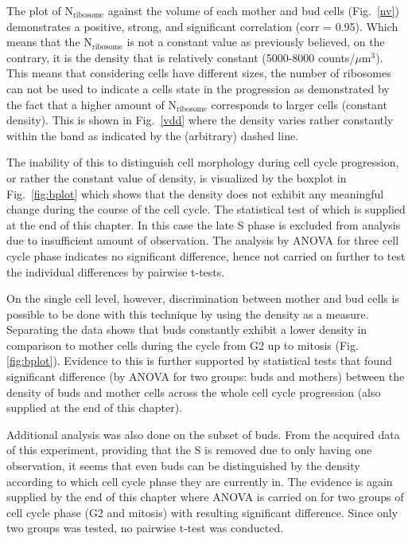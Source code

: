 The plot of N$_{\text{ribosome}}$ against the volume of each mother and bud cells (Fig.~\ref{nv}) demonstrates a positive, strong, and significant correlation (corr = 0.95). 
Which means that the N$_{\text{ribosome}}$ is not a constant value as previously believed, on the contrary, it is the density that is relatively constant (5000-8000 counts/$\mu$m$^3$).
This means that considering cells have different sizes, the number of ribosomes can not be used to indicate a cells state in the progression as demonstrated by the fact that a higher amount of N$_{\text{ribosome}}$ corresponds to larger cells (constant density). 
This is shown in Fig.~\ref{vdd} where the density varies rather constantly within the band as indicated by the (arbitrary) dashed line.

The inability of this to distinguish cell morphology during cell cycle progression, or rather the constant value of density, is visualized by the boxplot in Fig.~\ref{fig:bplot} which shows that the density does not exhibit any meaningful change during the course of the cell cycle. 
The statistical test of which is supplied at the end of this chapter. In this case the late S phase is excluded from analysis due to insufficient amount of observation. 
The analysis by ANOVA for three cell cycle phase indicates no significant difference, hence not carried on further to test the individual differences by pairwise t-tests.

On the single cell level, however, discrimination between mother and bud cells is possible to be done with this technique by using the density as a measure. 
Separating the data shows that buds constantly exhibit a lower density in comparison to mother cells during the cycle from G2 up to mitosis (Fig.\ref{fig:bplot}). 
Evidence to this is further supported by statistical tests that found significant difference (by ANOVA for two groups: buds and mothers) between the density of buds and mother cells across the whole cell cycle progression (also supplied at the end of this chapter). 

Additional analysis was also done on the subset of buds. 
From the acquired data of this experiment, providing that the S is removed due to only having one observation, it seems that even buds can be distinguished by the density according to which cell cycle phase they are currently in. 
The evidence is again supplied by the end of this chapter where ANOVA is carried on for two groups of cell cycle phase (G2 and mitosis) with resulting significant difference.
Since only two groups was tested, no pairwise t-test was conducted.


